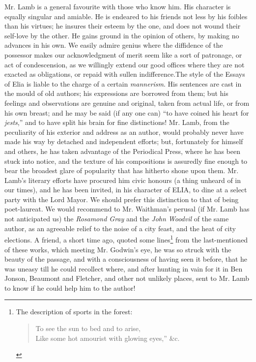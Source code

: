 Mr. Lamb is a general favourite with those who know him. His
character is equally singular and amiable. He is endeared to his
friends not less by his foibles than his virtues; he insures their
esteem by the one, and does not wound their self-love by the
other. He gains ground in the opinion of others, by making no
advances in his own. We easily admire genius where the diffidence
of the possessor makes our acknowledgment of merit seem like a
sort of patronage, or act of condescension, as we willingly extend
our good offices where they are not exacted as obligations, or
repaid with sullen indifference.\textemdash The style of the
Essays of Elia is liable to the charge of a certain
\emph{mannerism}. His sentences are cast in the mould of old
authors; his expressions are borrowed from them; but his feelings
and observations are genuine and original, taken from actual life,
or from his own breast; and he may be said (if any one can) ``to
have coined his heart for \emph{jests},'' and to have split his
brain for fine distinctions! Mr. Lamb, from the peculiarity of his
exterior and address as an author, would probably never have made
his way by detached and independent efforts; but, fortunately for
himself and others, he has taken advantage of the Periodical
Press, where he has been stuck into notice, and the texture of his
compositions is assuredly fine enough to bear the broadest glare
of popularity that has hitherto shone upon them.  Mr. Lamb's
literary efforts have procured him civic honours (a thing unheard
of in our times), and he has been invited, in his character of
ELIA, to dine at a select party with the Lord Mayor. We should
prefer this distinction to that of being poet-laureat. We would
recommend to Mr. Waithman's perusal (if Mr. Lamb has not
anticipated us) the \emph{Rosamond Gray} and the \emph{John
  Woodvil} of the same author, as an agreeable relief to the noise
of a city feast, and the heat of city elections. A friend, a short
time ago, quoted some lines\footnote{The description of sports in
  the forest:
\begin{verse}
  To see the sun to bed and to arise,\\
  Like some hot amourist with glowing eyes,'' \&c.
\end{verse}} from the last-mentioned of these works, which meeting
Mr. Godwin's eye, he was so struck with the beauty of the passage,
and with a consciousness of having seen it before, that he was
uneasy till he could recollect where, and after hunting in vain
for it in Ben Jonson, Beaumont and Fletcher, and other not
unlikely places, sent to Mr. Lamb to know if he could help him to
the author!

